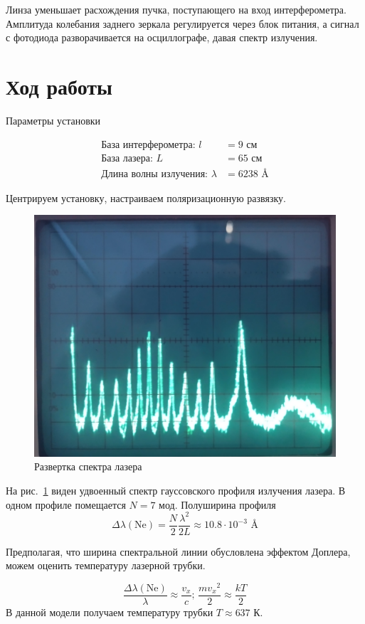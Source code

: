 \documentclass{article}
\begin{document}
Линза уменьшает расхождения пучка, поступающего на вход интерферометра. Амплитуда
колебания заднего зеркала регулируется через блок питания, а сигнал с фотодиода
разворачивается на осциллографе, давая спектр излучения.
 
\section{Ход работы}
Параметры установки

\begin{align*}
    \text{База интерферометра: \ \ } l&=9\text{ см}\\
    \text{База лазера: \ \ } L&=65\text{ см}\\
    \text{Длина волны излучения: \ \ } \lambda&=6238 \text{ \AA}
\end{align*}

Центрируем установку, настраиваем поляризационную развязку.

\begin{figure}[h]
    \center\includegraphics[width=0.5\linewidth]{spectrum_1.jpg}
    \caption{Развертка спектра лазера}\label{fig:spectrum_1}
\end{figure}

На рис.~\ref{fig:spectrum_1} виден удвоенный спектр гауссовского профиля
излучения лазера. В одном профиле помещается $N=7$ мод. Полуширина профиля
\begin{equation}
    \Delta\lambda(\text{Ne})=\frac{N}{2} \frac{\lambda^2}{2L} \approx
    10.8 \cdot 10^{-3}\text{ \AA}
\end{equation}

Предполагая, что ширина спектральной линии обусловлена эффектом Доплера, можем оценить
температуру лазерной трубки.

\begin{equation}
    \frac{\Delta\lambda(\text{Ne})}{\lambda}\approx\frac{v_x}{c}
    \text{;\ \ \ } \frac{m{v_x}^2}{2} \approx \frac{kT}{2}
\end{equation}
В данной модели получаем температуру трубки $T\approx 637$ К.
\end{document}
